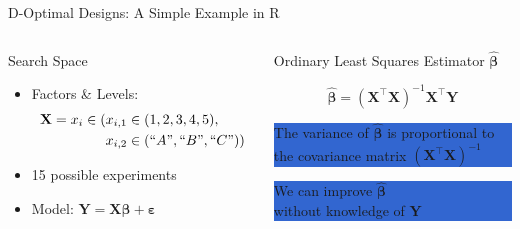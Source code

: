 \documentclass[10pt, compress, aspectratio=169, xcolor={table,usenames,dvipsnames}]{beamer}
\begin{document}
\begin{frame}[label={sec:orgcfc28a7}]{D-Optimal Designs: A Simple Example in R}
\begin{columns}
\begin{column}{0.5\columnwidth}
\begin{block}{Search Space}
\begin{itemize}
\item Factors \& Levels:
\begin{align*}
\mathbf{X} = x_i \in (x_{i,1} \in & \; (1, 2, 3, 4, 5), \\
x_{i,2} \in & \; (``A", ``B", ``C"))
\end{align*}
\item 15 possible experiments
\item Model: \(\mathbf{Y} = \mathbf{X}\bm{\beta} + \bm{\varepsilon}\)
\end{itemize}
\end{block}
\end{column}

\begin{column}{0.5\columnwidth}
\begin{block}{Ordinary Least Squares Estimator \(\bm{\hat{\beta}}\)}
\begin{center}
\begin{equation*}
\bm{\hat{\beta}} = \left(\bm{X}^{\intercal}\bm{X}\right)^{-1}\bm{X}^{\intercal}\bm{Y}
\end{equation*}
\end{center}

\begin{center}
\colorbox{Highlight}{\parbox[c]{0.8\columnwidth}{\centering   The  variance   of
    $\bm{\hat{\beta}}$  is  \alert{proportional}  to \\  the  covariance  matrix
    $\left(\bm{X}^{\intercal}\bm{X}\right)^{-1}$}}

\pause

\colorbox{Highlight}{\parbox[c]{0.8\columnwidth}{\centering   We   can   improve
    $\bm{\hat{\beta}}$ \\ \alert{without knowledge} of $\bm{Y}$}}
\end{center}
\end{block}
\end{column}
\end{columns}
\end{frame}
\end{document}
